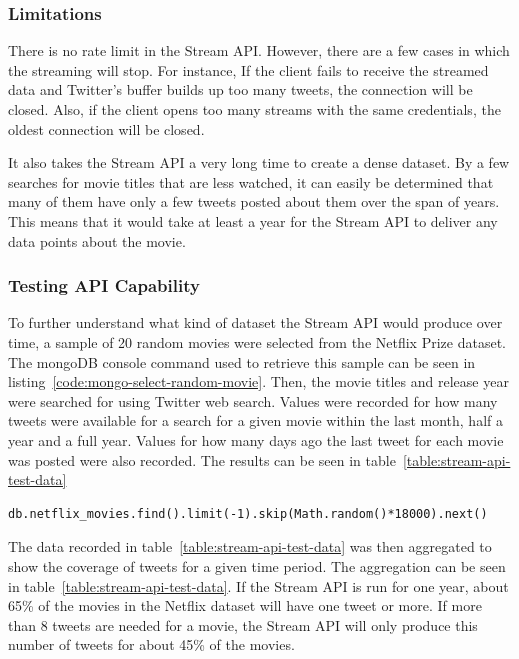 \subsubsection{Limitations}
There is no rate limit in the Stream API. However, there are a few cases in which the streaming will stop. For instance, If the client fails to receive the streamed data and Twitter's buffer builds up too many tweets, the connection will be closed. Also, if the client opens too many streams with the same credentials, the oldest connection will be closed.

It also takes the Stream API a very long time to create a dense dataset. By a few searches for movie titles that are less watched, it can easily be determined that many of them have only a few tweets posted about them over the span of years. This means that it would take at least a year for the Stream API to deliver any data points about the movie.

\subsubsection{Testing API Capability}\label{sec:pre-stream-api-testing}
To further understand what kind of dataset the Stream API would produce over time, a sample of 20 random movies were selected from the Netflix Prize dataset. The mongoDB console command used to retrieve this sample can be seen in listing~\ref{code:mongo-select-random-movie}. Then, the movie titles and release year were searched for using Twitter web search. Values were recorded for how many tweets were available for a search for a given movie within the last month, half a year and a full year. Values for how many days ago the last tweet for each movie was posted were also recorded. The results can be seen in table~\ref{table:stream-api-test-data}

\begin{lstlisting}[caption={The mongoDB console command used to generate a random selection of movies},label={code:mongo-select-random-movie},captionpos=b]
db.netflix_movies.find().limit(-1).skip(Math.random()*18000).next()
\end{lstlisting}

The data recorded in table~\ref{table:stream-api-test-data} was then aggregated to show the coverage of tweets for a given time period. The aggregation can be seen in table~\ref{table:stream-api-test-data}. If the Stream API is run for one year, about 65\% of the movies in the Netflix dataset will have one tweet or more. If more than 8 tweets are needed for a movie, the Stream API will only produce this number of tweets for about 45\% of the movies.

